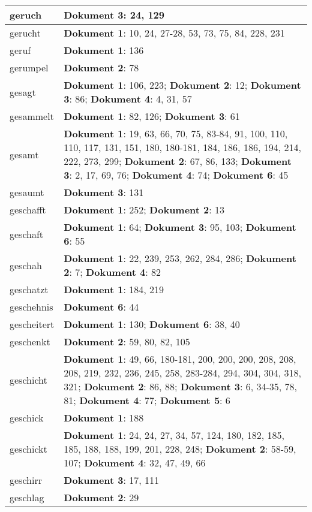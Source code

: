 \documentclass[a5paper]{article}
\begin{document}
\begin{longtable}[l]{|l|p{3in}|}
\hline
geruch & \textbf{Dokument 3}: 24, 129 \\
\hline
gerucht & \textbf{Dokument 1}: 10, 24, 27-28, 53, 73, 75, 84, 228, 231 \\
\hline
geruf & \textbf{Dokument 1}: 136 \\
\hline
gerumpel & \textbf{Dokument 2}: 78 \\
\hline
gesagt & \textbf{Dokument 1}: 106, 223; \textbf{Dokument 2}: 12; \textbf{Dokument 3}: 86; \textbf{Dokument 4}: 4, 31, 57 \\
\hline
gesammelt & \textbf{Dokument 1}: 82, 126; \textbf{Dokument 3}: 61 \\
\hline
gesamt & \textbf{Dokument 1}: 19, 63, 66, 70, 75, 83-84, 91, 100, 110, 110, 117, 131, 151, 180, 180-181, 184, 186, 186, 194, 214, 222, 273, 299; \textbf{Dokument 2}: 67, 86, 133; \textbf{Dokument 3}: 2, 17, 69, 76; \textbf{Dokument 4}: 74; \textbf{Dokument 6}: 45 \\
\hline
gesaumt & \textbf{Dokument 3}: 131 \\
\hline
geschafft & \textbf{Dokument 1}: 252; \textbf{Dokument 2}: 13 \\
\hline
geschaft & \textbf{Dokument 1}: 64; \textbf{Dokument 3}: 95, 103; \textbf{Dokument 6}: 55 \\
\hline
geschah & \textbf{Dokument 1}: 22, 239, 253, 262, 284, 286; \textbf{Dokument 2}: 7; \textbf{Dokument 4}: 82 \\
\hline
geschatzt & \textbf{Dokument 1}: 184, 219 \\
\hline
geschehnis & \textbf{Dokument 6}: 44 \\
\hline
gescheitert & \textbf{Dokument 1}: 130; \textbf{Dokument 6}: 38, 40 \\
\hline
geschenkt & \textbf{Dokument 2}: 59, 80, 82, 105 \\
\hline
geschicht & \textbf{Dokument 1}: 49, 66, 180-181, 200, 200, 200, 208, 208, 208, 219, 232, 236, 245, 258, 283-284, 294, 304, 304, 318, 321; \textbf{Dokument 2}: 86, 88; \textbf{Dokument 3}: 6, 34-35, 78, 81; \textbf{Dokument 4}: 77; \textbf{Dokument 5}: 6 \\
\hline
geschick & \textbf{Dokument 1}: 188 \\
\hline
geschickt & \textbf{Dokument 1}: 24, 24, 27, 34, 57, 124, 180, 182, 185, 185, 188, 188, 199, 201, 228, 248; \textbf{Dokument 2}: 58-59, 107; \textbf{Dokument 4}: 32, 47, 49, 66 \\
\hline
geschirr & \textbf{Dokument 3}: 17, 111 \\
\hline
geschlag & \textbf{Dokument 2}: 29 \\

\end{longtable}
\end{document}
